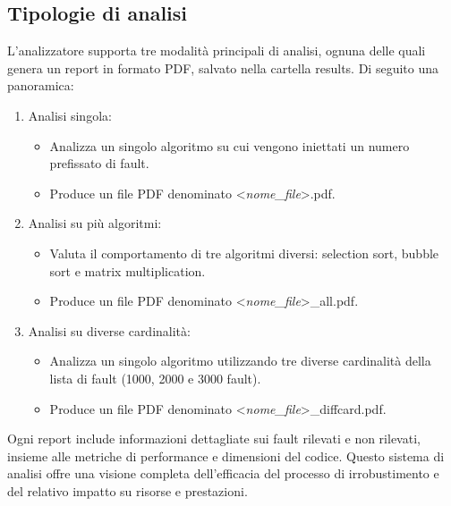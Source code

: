 \subsection{Tipologie di analisi}
L'analizzatore supporta tre modalità principali di analisi, ognuna delle quali genera un report in formato PDF, salvato nella cartella results. Di seguito una panoramica:
\begin{enumerate}
\item Analisi singola:
    \begin{itemize}
        \item Analizza un singolo algoritmo su cui vengono iniettati un     numero prefissato di fault.
        \item Produce un file PDF denominato \textless \textit{nome\_file}\textgreater.pdf.
    \end{itemize}

\item Analisi su più algoritmi:
    \begin{itemize}
        \item Valuta il comportamento di tre algoritmi diversi:     selection sort, bubble sort e matrix multiplication.
        \item Produce un file PDF denominato \textless \textit{nome\_file}\textgreater\_all.pdf.
    \end{itemize}

\item Analisi su diverse cardinalità:
    \begin{itemize}
        \item Analizza un singolo algoritmo utilizzando tre diverse cardinalità della lista di fault (1000, 2000 e 3000 fault).
        \item Produce un file PDF denominato \textless \textit{nome\_file}\textgreater\_diffcard.pdf.
    \end{itemize}
\end{enumerate}
Ogni report include informazioni dettagliate sui fault rilevati e non rilevati, insieme alle metriche di performance e dimensioni del codice. Questo sistema di analisi offre una visione completa dell'efficacia del processo di irrobustimento e del relativo impatto su risorse e prestazioni.